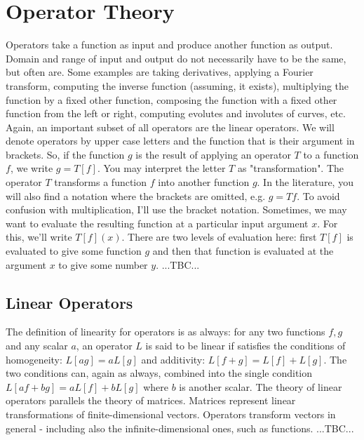 \section{Operator Theory}
Operators take a function as input and produce another function as output. Domain and range of input and output do not necessarily have to be the same, but often are. Some examples are taking derivatives, applying a Fourier transform, computing the inverse function (assuming, it exists), multiplying the function by a fixed other function, composing the function with a fixed other function from the left or right, computing evolutes and involutes of curves, etc. Again, an important subset of all operators are the linear operators. We will denote operators by upper case letters and the function that is their argument in brackets. So, if the function $g$ is the result of applying an operator $T$ to a function $f$, we write $g = T[f]$. You may interpret the letter $T$ as "transformation". The operator $T$ transforms a function $f$ into another function $g$. In the literature, you will also find a notation where the brackets are omitted, e.g. $g = T f$. To avoid confusion with multiplication, I'll use the bracket notation. Sometimes, we may want to evaluate the resulting function at a particular input argument $x$. For this, we'll write $T[f](x)$. There are two levels of evaluation here: first $T[f]$ is evaluated to give some function $g$ and then that function is evaluated at the argument $x$ to give some number $y$. ...TBC...




\subsection{Linear Operators}
The definition of linearity for operators is as always: for any two functions $f,g$ and any scalar $a$, an operator $L$ is said to be linear if satisfies the conditions of homogeneity: $L[a g] = a L[g]$ and additivity: $L[f+g] = L[f] + L[g]$. The two conditions can, again as always, combined into the single condition $L[af+bg] = aL[f] + bL[g]$ where $b$ is another scalar. The theory of linear operators parallels the theory of matrices. Matrices represent linear transformations of finite-dimensional vectors. Operators transform vectors in general - including also the infinite-dimensional ones, such as functions. ...TBC...


